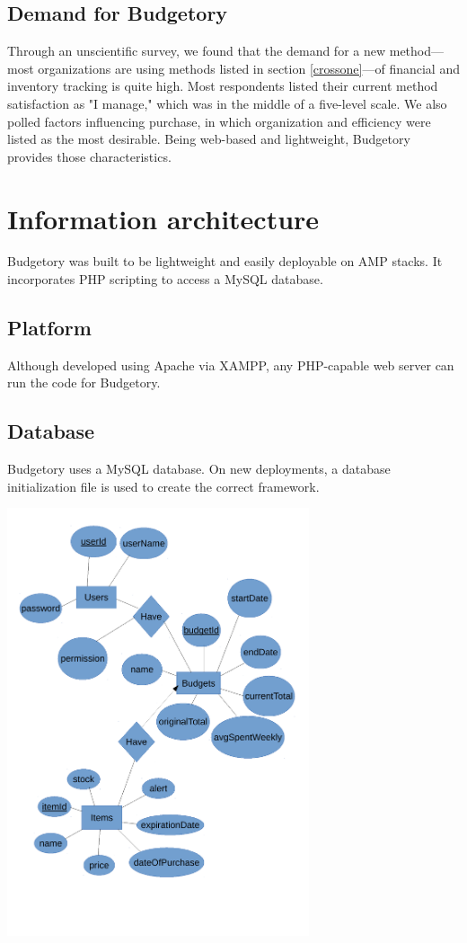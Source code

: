 \documentclass{article}
\begin{document}
\vspace{20pt}
\subsection{Demand for \textsf{Budgetory}}
Through an unscientific survey, we found that the demand for a new method---most organizations are using  methods listed in section \ref{crossone}---of financial and inventory tracking is quite high. Most respondents listed their current method satisfaction as "I manage," which was in the middle of a five-level scale. We also polled factors influencing purchase, in which organization and efficiency were listed as the most desirable. Being web-based and lightweight, \textsf{Budgetory} provides those characteristics.

\vspace{40pt}
\section{Information architecture}
\textsf{Budgetory} was built to be lightweight and easily deployable on AMP stacks. It incorporates PHP scripting to access a MySQL database.

\vspace{20pt}
\subsection{Platform}
Although developed using Apache via XAMPP, any PHP-capable web server can run the code for \textsf{Budgetory}.

\vspace{20pt}
\subsection{Database}
\textsf{Budgetory} uses a MySQL database. On new deployments, a database initialization file is used to create the correct framework.
{\centering \includegraphics[width=3.5in,page=1,keepaspectratio]{ER_diagram_graphic.pdf} \par}
\end{document}
